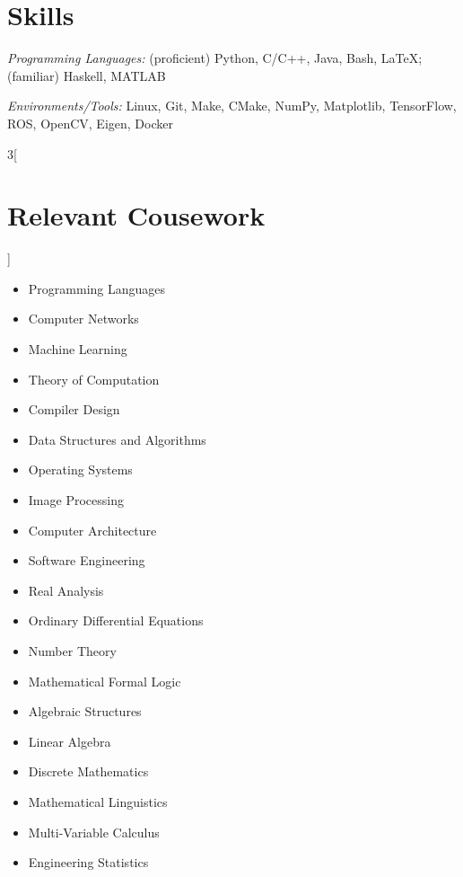 \documentclass[\ifdefined\cv11pt\else10pt\fi,letterpaper,roman]{moderncv}
\newcommand{\cvonly}[1]{\ifdefined\cv#1\fi}
\let\oldsection\section
\renewcommand{\section}[1]{\vspace*{-1.3ex}\oldsection{#1}\vspace*{-0.5ex}}
\begin{document}
\section{Skills}
\textit{Programming Languages:} (proficient) Python, C/C++, Java, Bash, \LaTeX; (familiar) Haskell, MATLAB \par
\textit{Environments/Tools:} Linux, Git, Make, CMake, NumPy, Matplotlib, TensorFlow, ROS, OpenCV\cvonly{, Eigen, Docker} \par
\begin{multicols}{3}[\section{Relevant Cousework}\vspace*{-1.2\topsep}]
\begin{itemize}
	\item Programming Languages
	\item Computer Networks
	\item Machine Learning
	\item Theory of Computation
	\item Compiler Design
	\item Data Structures and Algorithms
	\item Operating Systems
	\item Image Processing
	\item Computer Architecture
	\item Software Engineering
	\item Real Analysis
	\item Ordinary Differential Equations
	\item Number Theory
	\item Mathematical Formal Logic
	\item Algebraic Structures
	\item Linear Algebra
	\item Discrete Mathematics
	\cvonly{
		\item Mathematical Linguistics
		\item Multi-Variable Calculus
		\item Engineering Statistics
	}
\end{itemize}
\end{multicols}
\vspace{-2.8ex}
\end{document}
